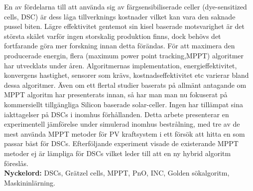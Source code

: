 En av fördelarna till att använda sig av färgsensibiliserade celler (dye-sensitized cells, DSC) är dess låga tillverknings kostnader vilket kan vara den saknade pussel biten. Lägre effektivitet gentemot sin kisel baserade motsvarighet är det största skälet varför ingen storskalig produktion finns, dock behövs det fortfarande göra mer forskning innan detta förändas. För att maximera den producerade energin, flera (maximum power point tracking,MPPT) algoritmer har utvecklats under åren. Algoritmernas implementation, energieffektivitet, konvergens hastighet, sensorer som krävs, kostnadseffektivitet etc varierar bland dessa algoritmer. Även om ett flertal studier baserats på allmänt antagande om MPPT algoritm har presenterats innan, så har man man nu fokuserat på kommersiellt tillgängliga Silicon baserade solar-celler. Ingen har tillämpat sina iakttagelser på DSCs i inomhus förhållanden. Detta arbete presenterar en experimentell jämförelse under simulerad inomhus bestrålning, med tre av de mest använda MPPT metoder för PV kraftsystem i ett försök att hitta en som passar bäst för DSCs. Efterföljande experiment visade de existerande MPPT metoder ej är lämpliga för DSCs vilket leder till att en ny hybrid algoritm föreslås.\\

{\bf Nyckelord:} DSCs, Grätzel cells, MPPT, PnO, INC, Golden sökalgoritm, Maskininlärning. 
\acresetall
